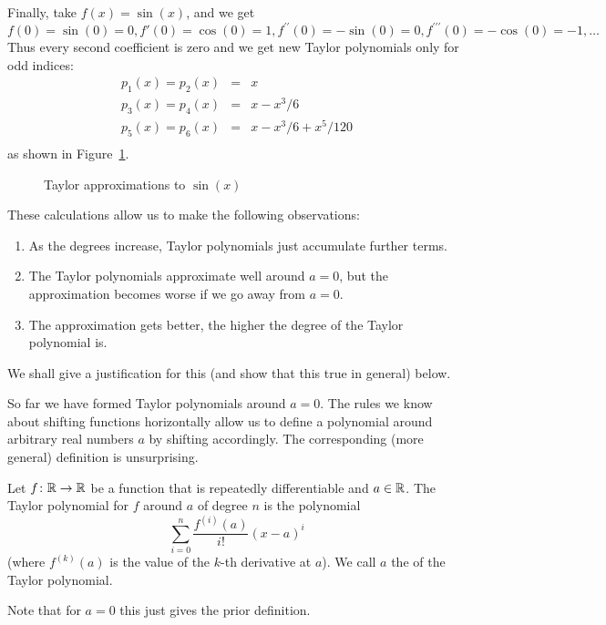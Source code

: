 Finally, take $f(x)=\sin(x)$, and we get
\[
f(0)=\sin(0)=0, f'(0)=\cos(0)=1,
f^{\prime\prime}(0)=-\sin(0)=0,
f^{\prime\prime\prime}(0)=-\cos(0)=-1,\ldots
\]
Thus every second coefficient is zero and we get new Taylor polynomials only
for odd indices:
\begin{eqnarray*}
p_1(x)=p_2(x)&=&x\\
p_3(x)=p_4(x)&=&x-x^3/6\\
p_5(x)=p_6(x)&=&x-x^3/6+x^5/120\\
\end{eqnarray*}
as shown in Figure~\ref{figtaysin}.
\begin{figure}
\begin{center}
\end{center}
\caption{Taylor approximations to $\sin(x)$}
\label{figtaysin}
\end{figure}
These calculations allow us to make the following observations:
\begin{enumerate}
\item As the degrees increase, Taylor polynomials just accumulate further
terms.
\item The Taylor polynomials approximate well around $a=0$, but the
approximation becomes worse if we go away from $a=0$.
\item The approximation gets better, the higher the degree of the Taylor
polynomial is.
\end{enumerate}
We shall give a justification for this (and show that this true in general)
below.
\bigskip

So far we have formed Taylor polynomials around $a=0$. The rules we know
about shifting functions horizontally allow us to define a polynomial around
arbitrary real numbers $a$ by shifting accordingly. The corresponding (more
general) definition is unsurprising.
\begin{defn}
Let $f\colon{\mathbb R}\to{\mathbb R}$ be a function that is repeatedly differentiable
and $a\in{\mathbb R}$.
The Taylor polynomial for $f$ around $a$ of degree $n$ is the polynomial
\[
\sum_{i=0}^n\frac{f^{(i)}(a)}{i!} (x-a)^i
\]
(where $f^{(k)}(a)$ is the value of the $k$-th derivative at $a$). We call $a$
the  of the Taylor polynomial.
\end{defn}
Note that for $a=0$ this just gives the prior definition.

